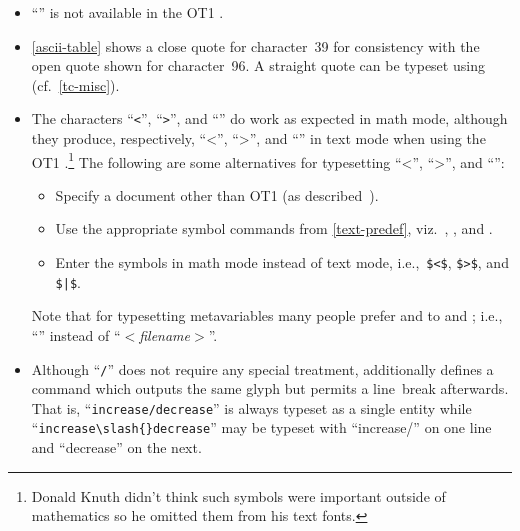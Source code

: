 \begin{itemize}
  \item
  ``\indexcommand[\string\encone{\string\textquotedbl}]{\textquotedbl}{\encone{\textquotedbl}}''
  is not available in the OT1 \fntenc[OT1].

  \item \ref{ascii-table} shows a close quote for character~39 for
    consistency with the open quote shown for character~96.  A
    straight quote can be typeset using \cmdI{\textquotesingle}
    (cf.~\ref{tc-misc}).

  \item
  The\label{upside-down} characters ``\texttt{<}'', ``\texttt{>}'', and
  ``\texttt{\textbar}'' do work as expected in math mode, although they
  produce, respectively, ``<'', ``>'', and ``\textbar'' in text mode when
  using the OT1 \fntenc[OT1].\footnote{Donald
  Knuth didn't think such symbols were important outside of
  mathematics so he omitted them from his text fonts.} The following
  are some alternatives for typesetting ``\textless'',
  ``\textgreater'', and ``\textbar'':

  \begin{itemize}
    \item Specify a document \fntenc{} other than OT1 (as
    described~).

    \item Use the appropriate symbol commands from
    \vref{text-predef}, viz.~\cmdI{\textless},
    \cmdI{\textgreater}, and \cmdI{\textbar}.

    \item Enter the symbols in math mode instead of text mode,
    i.e.,~\verb+$<$+, \verb+$>$+, and \verb+$|$+.
  \end{itemize}

  \noindent
  Note that for typesetting metavariables many people prefer
  \cmdI{\textlangle} and \cmdI{\textrangle} to \cmdI{\textless} and
  \cmdI{\textgreater}; i.e., ``'' instead of
  ``$<$\textit{filename}$>$''.

  \item Although ``\texttt{/}'' does not require any special
  treatment, \latex additionally defines a \cmdI{\slash} command which
  outputs the same glyph but permits a line~break afterwards.  That
  is, ``\texttt{increase/decrease}'' is always typeset as a single
  entity while ``\verb|increase\slash{}decrease|'' may be typeset with
  ``increase/'' on one line and ``decrease'' on the next.


\end{itemize}
